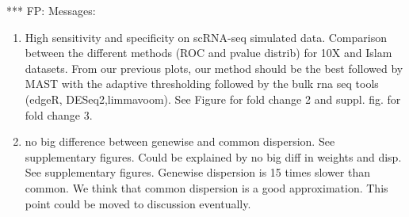 \documentclass{bmcart}
\begin{document}
{\color{blue} *** FP: Messages:
\begin{enumerate}
  \item High sensitivity and specificity on scRNA-seq simulated data. Comparison between the different methods (ROC and pvalue distrib) for 10X and Islam datasets. From our previous plots, our method should be the best followed by MAST with the adaptive thresholding followed by the bulk rna seq tools (edgeR, DESeq2,limmavoom). See Figure for fold change 2 and suppl. fig. for fold change 3.
  \item no big difference between genewise and common dispersion. See supplementary figures. Could be explained by no big diff in weights and disp. See supplementary figures. Genewise dispersion is 15 times slower than common. We think that common dispersion is a good approximation. This point could be moved to discussion eventually.
\end{enumerate}
}
\end{document}
